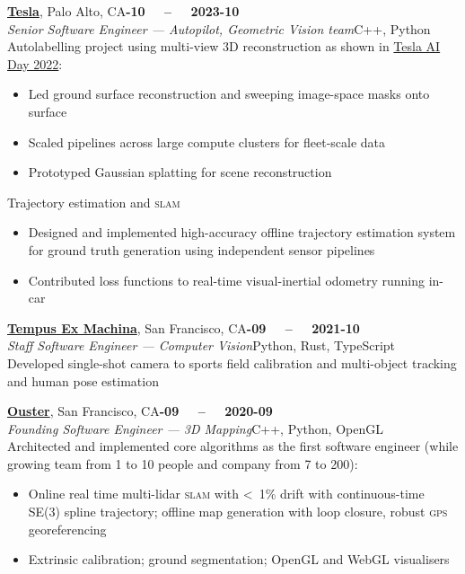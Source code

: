 \documentclass[margin,9pt]{res}
\begin{document}
\begin{resume}
    \href{https://tesla.com/ai}{\textbf{Tesla}}, Palo Alto, CA\hfill \textsc{\bfseries{}-10~~ -- ~~2023-10}\\
    \textit{Senior Software Engineer --- Autopilot, Geometric Vision team}\hfill C++, Python
    \vspace{0.5em}\\
    Autolabelling project using multi-view 3D reconstruction as shown in \href{https://youtu.be/ODSJsviD_SU?t=6034}{Tesla AI Day 2022}:
    \begin{itemize}
        \item Led ground surface reconstruction and sweeping image-space masks onto surface
        \item Scaled pipelines across large compute clusters for fleet-scale data
        \item Prototyped Gaussian splatting for scene reconstruction
    \end{itemize}
    Trajectory estimation and \textsc{slam}
    \begin{itemize}
        \item Designed and implemented high-accuracy offline trajectory estimation system for ground truth generation using independent sensor pipelines
        \item Contributed loss functions to real-time visual-inertial odometry running in-car
    \end{itemize}

    \href{https://tempus-ex.com}{\textbf{Tempus Ex Machina}}, San Francisco, CA\hfill \textsc{\bfseries{}-09~~ -- ~~2021-10}\\
    \textit{Staff Software Engineer --- Computer Vision}\hfill Python, Rust, TypeScript
    \vspace{0.5em}\\
    Developed single-shot camera to sports field calibration and multi-object tracking and human pose estimation

    \href{https://ouster.com}{\textbf{Ouster}}, San Francisco, CA\hfill \textsc{\bfseries{}-09~~ -- ~~2020-09}\\
    \textit{Founding Software Engineer --- 3D Mapping}\hfill C++, Python, OpenGL
    \vspace{0.5em}\\
    Architected and implemented core algorithms as the first software engineer (while growing team from 1 to 10 people and company from 7 to 200):
    \begin{itemize}
        \item Online real time multi-lidar \textsc{slam} with <~1\% drift with continuous-time SE(3) spline trajectory; offline map generation with loop closure, robust \textsc{gps} georeferencing
        \item Extrinsic calibration; ground segmentation; OpenGL and WebGL visualisers
    \end{itemize}

\end{resume}
\end{document}
